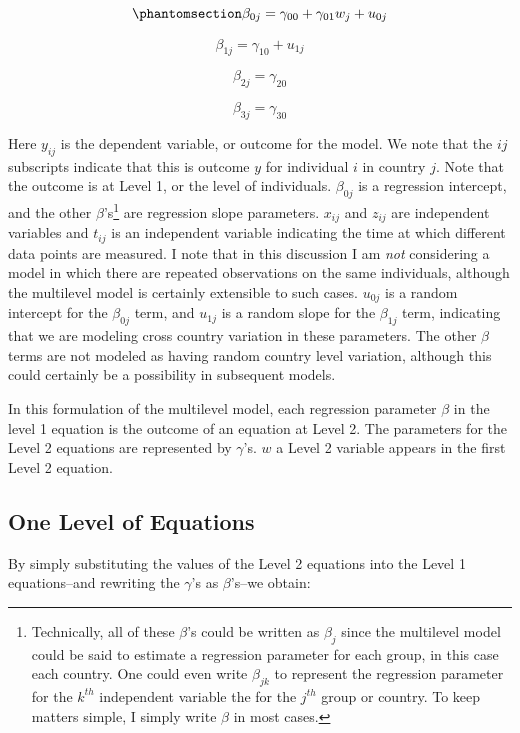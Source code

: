 \documentclass[
  letterpaper,
  DIV=11,
  numbers=noendperiod]{scrreprt}
\begin{document}
\begin{equation}\phantomsection\label{eq-MLM2}{\beta_{0j} = \gamma_{00} +\gamma_{01} w_j + u_{0j}}\end{equation}

\[\beta_{1j} = \gamma_{10} + u_{1j}\]

\[\beta_{2j} = \gamma_{20}\]

\[\beta_{3j} = \gamma_{30}\]

Here \(y_{ij}\) is the dependent variable, or outcome for the model. We
note that the \(ij\) subscripts indicate that this is outcome \(y\) for
individual \(i\) in country \(j\). Note that the outcome is at Level 1,
or the level of individuals. \(\beta_{0j}\) is a regression intercept,
and the other \(\beta\)'s\footnote{Technically, all of these \(\beta\)'s
  could be written as \(\beta_j\) since the multilevel model could be
  said to estimate a regression parameter for each group, in this case
  each country. One could even write \(\beta_{jk}\) to represent the
  regression parameter for the \(k^{th}\) independent variable the for
  the \(j^{th}\) group or country. To keep matters simple, I simply
  write \(\beta\) in most cases.} are regression slope parameters.
\(x_{ij}\) and \(z_{ij}\) are independent variables and \(t_{ij}\) is an
independent variable indicating the time at which different data points
are measured. I note that in this discussion I am \emph{not} considering
a model in which there are repeated observations on the same
individuals, although the multilevel model is certainly extensible to
such cases. \(u_{0j}\) is a random intercept for the \(\beta_{0j}\)
term, and \(u_{1j}\) is a random slope for the \(\beta_{1j}\) term,
indicating that we are modeling cross country variation in these
parameters. The other \(\beta\) terms are not modeled as having random
country level variation, although this could certainly be a possibility
in subsequent models.

In this formulation of the multilevel model, each regression parameter
\(\beta\) in the level 1 equation is the outcome of an equation at Level
2. The parameters for the Level 2 equations are represented by
\(\gamma\)'s. \(w\) a Level 2 variable appears in the first Level 2
equation.

\subsection{One Level of Equations}\label{one-level-of-equations}

By simply substituting the values of the Level 2 equations into the
Level 1 equations--and rewriting the \(\gamma\)'s as \(\beta\)'s--we
obtain:
\end{document}
